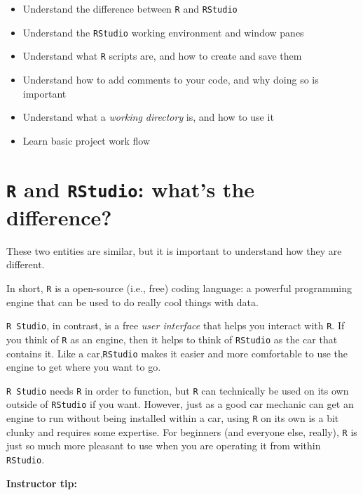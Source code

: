\documentclass[
]{book}
\providecommand{\tightlist}{%
  \setlength{\itemsep}{0pt}\setlength{\parskip}{0pt}}
\begin{document}
\begin{itemize}
\tightlist
\item
  Understand the difference between \texttt{R} and \texttt{RStudio}
\item
  Understand the \texttt{RStudio} working environment and window panes\\
\item
  Understand what \texttt{R} scripts are, and how to create and save them
\item
  Understand how to add comments to your code, and why doing so is important
\item
  Understand what a \emph{working directory} is, and how to use it
\item
  Learn basic project work flow
\end{itemize}

\hypertarget{r-and-rstudio-whats-the-difference}{%
\section*{\texorpdfstring{\texttt{R} and \texttt{RStudio}: what's the difference?}{R and RStudio: what's the difference?}}\label{r-and-rstudio-whats-the-difference}}

These two entities are similar, but it is important to understand how they are different.

In short, \texttt{R} is a open-source (i.e., free) coding language: a powerful programming engine that can be used to do really cool things with data.

\texttt{R\ Studio}, in contrast, is a free \emph{user interface} that helps you interact with \texttt{R}. If you think of \texttt{R} as an engine, then it helps to think of \texttt{RStudio} as the car that contains it. Like a car,\texttt{RStudio} makes it easier and more comfortable to use the engine to get where you want to go.

\texttt{R\ Studio} needs \texttt{R} in order to function, but \texttt{R} can technically be used on its own outside of \texttt{RStudio} if you want. However, just as a good car mechanic can get an engine to run without being installed within a car, using \texttt{R} on its own is a bit clunky and requires some expertise. For beginners (and everyone else, really), \texttt{R} is just so much more pleasant to use when you are operating it from within \texttt{RStudio}.

\leavevmode{}%
\textbf{Instructor tip:}
\end{document}
